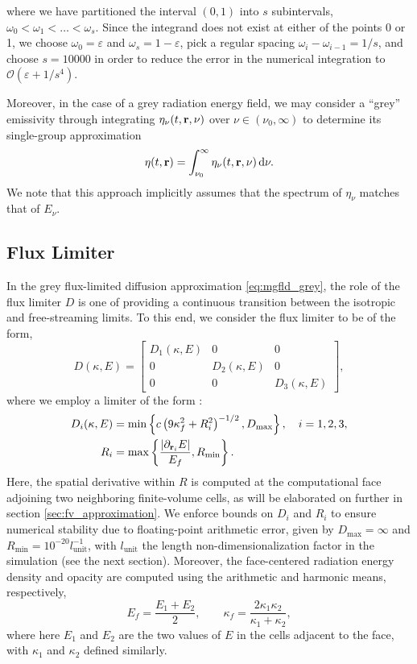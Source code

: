 \documentclass[10pt]{article}
\renewcommand{\(}{\left(}
\renewcommand{\)}{\right)}
\newcommand{\rvec}{{\bf r}}
\newcommand{\Enu}{E_{\nu}}
\newcommand{\Lunit}{l_{\text{unit}}}
\begin{document}
where we have partitioned the interval $(0,1)$ into $s$
subintervals, $\omega_0<\omega_1<\ldots<\omega_s$.  Since the integrand does not
exist at either of the points 0 or 1, we choose $\omega_0=\varepsilon$ and
$\omega_s = 1-\varepsilon$, pick a regular spacing $\omega_i-\omega_{i-1}=1/s$, and
choose $s=10000$ in order to reduce the error in the numerical
integration to $\mathcal O(\varepsilon + 1/s^4)$. 

Moreover, in the case of a grey radiation energy field, we may
consider a ``grey'' emissivity through integrating $\eta_{\nu}(t,\rvec,\nu)$ 
over $\nu\in(\nu_0,\infty)$ to determine its single-group
approximation
\begin{equation}
\label{eq:eta_T}
  \eta(t,\rvec) =\int_{\nu_0}^{\infty} \eta_{\nu}(t,\rvec,\nu)\,\mathrm d\nu.
\end{equation}
We note that this approach implicitly assumes that the spectrum of
$\eta_{\nu}$ matches that of $\Enu$.




\subsection{Flux Limiter}

In the grey flux-limited diffusion approximation
\eqref{eq:mgfld_grey}, the role of the flux limiter
$D$ is one of providing a continuous transition between the isotropic
and free-streaming limits.  To this end, we consider the flux limiter
to be of the form,
\[
   D(\kappa,E) = \left[\begin{array}{ccc} 
       D_1(\kappa,E) & 0 & 0 \\
       0 & D_2(\kappa,E) & 0 \\
       0 & 0 & D_3(\kappa,E) 
     \end{array}\right],
\]
where we employ a limiter of the form  \cite{Morel2000}: 
\begin{align}
  \label{eq:Morel_limiterD}
  D_i(\kappa,E) &= \min\left\{ c \left(9\kappa_f^2 + R_i^2\right)^{-1/2},
    D_\text{max} \right\}, \quad i=1,2,3,\\
  \label{eq:Morel_limiterR}
  R_i &= \max\left\{ \frac{|\partial_{\rvec_i}E|}{E_f}, R_\text{min} \right\}.
\end{align}
Here, the spatial derivative within $R$ is computed at the
computational face adjoining two neighboring finite-volume cells, as
will be elaborated on further in section \ref{sec:fv_approximation}.
We enforce bounds on $D_i$ and $R_i$ to ensure numerical stability due
to floating-point arithmetic error, given by 
$D_\text{max} = \infty$ 
and 
$R_\text{min} = 10^{-20} \Lunit^{-1}$, 
with $\Lunit$ the length non-dimensionalization factor in the simulation
(see the next section).  Moreover, the face-centered radiation energy
density and opacity are computed using the arithmetic and harmonic
means, respectively,
\[
  E_f = \frac{E_1 + E_2}{2}, \qquad \kappa_f =
  \frac{2\kappa_1\kappa_2}{\kappa_1+\kappa_2}, 
\]
where here $E_1$ and $E_2$ are the two values of $E$ in the cells
adjacent to the face, with $\kappa_1$ and $\kappa_2$ defined
similarly. 
\end{document}
